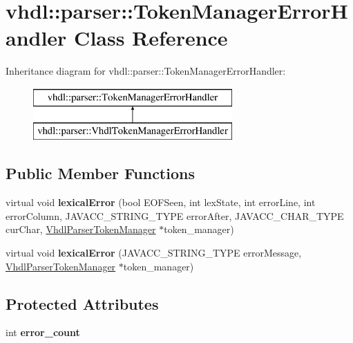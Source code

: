 \hypertarget{classvhdl_1_1parser_1_1_token_manager_error_handler}{}\section{vhdl\+::parser\+::Token\+Manager\+Error\+Handler Class Reference}
\label{classvhdl_1_1parser_1_1_token_manager_error_handler}
Inheritance diagram for vhdl\+::parser\+::Token\+Manager\+Error\+Handler\+:\begin{figure}[H]
\begin{center}
\leavevmode
\includegraphics[height=2.000000cm]{classvhdl_1_1parser_1_1_token_manager_error_handler}
\end{center}
\end{figure}
\subsection*{Public Member Functions}
\begin{DoxyCompactItemize}
\item 
\mbox{\label{classvhdl_1_1parser_1_1_token_manager_error_handler_afe651035e92eb68578ed92cb9f1638fb}} 
virtual void {\bfseries lexical\+Error} (bool E\+O\+F\+Seen, int lex\+State, int error\+Line, int error\+Column, J\+A\+V\+A\+C\+C\+\_\+\+S\+T\+R\+I\+N\+G\+\_\+\+T\+Y\+PE error\+After, J\+A\+V\+A\+C\+C\+\_\+\+C\+H\+A\+R\+\_\+\+T\+Y\+PE cur\+Char, \mbox{\hyperlink{classvhdl_1_1parser_1_1_vhdl_parser_token_manager}{Vhdl\+Parser\+Token\+Manager}} $\ast$token\+\_\+manager)
\item 
\mbox{\label{classvhdl_1_1parser_1_1_token_manager_error_handler_ad02a5d77f7a7ebc9f906de4faecd6b90}} 
virtual void {\bfseries lexical\+Error} (J\+A\+V\+A\+C\+C\+\_\+\+S\+T\+R\+I\+N\+G\+\_\+\+T\+Y\+PE error\+Message, \mbox{\hyperlink{classvhdl_1_1parser_1_1_vhdl_parser_token_manager}{Vhdl\+Parser\+Token\+Manager}} $\ast$token\+\_\+manager)
\end{DoxyCompactItemize}
\subsection*{Protected Attributes}
\begin{DoxyCompactItemize}
\item 
\mbox{\label{classvhdl_1_1parser_1_1_token_manager_error_handler_a6d2fbf9bff5de1775a78dc4872ccdca5}} 
int {\bfseries error\+\_\+count}
\end{DoxyCompactItemize}
